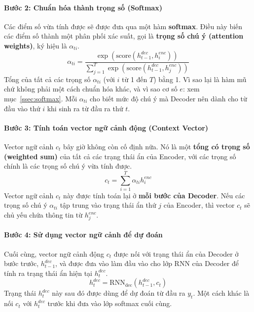 \paragraph{Bước 2: Chuẩn hóa thành trọng số (Softmax)}
Các điểm số vừa tính được sẽ được đưa qua một hàm \textbf{softmax}. Điều này biến các điểm số thành một phân phối xác suất, gọi là \textbf{trọng số chú ý (attention weights)}, ký hiệu là $\alpha_{ti}$.
$$ \alpha_{ti} = \frac{\exp(\text{score}(h_{t-1}^{dec}, h_i^{enc}))}{\sum_{j=1}^{T} \exp(\text{score}(h_{t-1}^{dec}, h_j^{enc}))} $$
Tổng của tất cả các trọng số $\alpha_{ti}$ (với $i$ từ 1 đến $T$) bằng 1. Vì sao lại là hàm mũ chứ không phải một cách chuẩn hóa khác, và vì sao cơ số $e$: xem mục~\ref{ssec:softmax}. Mỗi $\alpha_{ti}$ cho biết mức độ chú ý mà Decoder nên dành cho từ đầu vào thứ $i$ khi sinh ra từ đầu ra thứ $t$.

\paragraph{Bước 3: Tính toán vector ngữ cảnh động (Context Vector)}
Vector ngữ cảnh $c_t$ bây giờ không còn cố định nữa. Nó là một \textbf{tổng có trọng số (weighted sum)} của tất cả các trạng thái ẩn của Encoder, với các trọng số chính là các trọng số chú ý vừa tính được.
$$ c_t = \sum_{i=1}^{T} \alpha_{ti} h_i^{enc} $$
Vector ngữ cảnh $c_t$ này được tính toán lại ở \textbf{mỗi bước của Decoder}. Nếu các trọng số chú ý $\alpha_{ti}$ tập trung vào trạng thái ẩn thứ $j$ của Encoder, thì vector $c_t$ sẽ chủ yếu chứa thông tin từ $h_j^{enc}$.

\paragraph{Bước 4: Sử dụng vector ngữ cảnh để dự đoán}
Cuối cùng, vector ngữ cảnh động $c_t$ được nối với trạng thái ẩn của Decoder ở bước trước, $h_{t-1}^{dec}$, và được đưa vào làm đầu vào cho lớp RNN của Decoder để tính ra trạng thái ẩn hiện tại $h_t^{dec}$.
$$ h_t^{dec} = \text{RNN}_{\text{dec}}(h_{t-1}^{dec}, c_t) $$
Trạng thái $h_t^{dec}$ này sau đó được dùng để dự đoán từ đầu ra $y_t$. Một cách khác là nối $c_t$ với $h_t^{dec}$ trước khi đưa vào lớp softmax cuối cùng.

